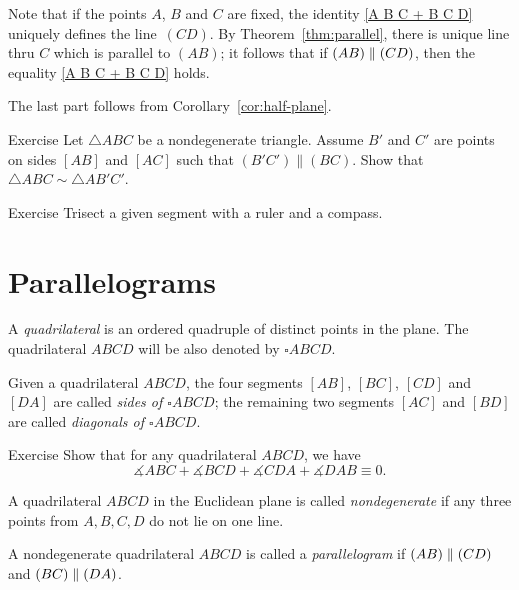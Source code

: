 Note that if the points $A$, $B$ and $C$ are fixed,
the identity \ref{A B C + B C D} uniquely defines the line~$(C D)$.
By Theorem~\ref{thm:parallel}, there is unique line thru $C$ which is parallel to $(AB)$;
it follows that
if $(AB)\z\parallel(C D)$, then the equality \ref{A B C + B C D} holds.

The last part follows from Corollary~\ref{cor:half-plane}.
\qeds


\begin{thm}{Exercise}\label{ex:smililar+parallel}
Let $\triangle ABC$ be a nondegenerate triangle.
Assume $B'$ and $C'$ are points on sides $[AB]$ and $[AC]$ such that $(B'C')\parallel(BC)$.
Show that $\triangle ABC\sim\triangle AB'C'$.
\end{thm}

\begin{thm}{Exercise}\label{ex:trisection}
Trisect a given segment with a ruler and a compass.
\end{thm}





\section*{Parallelograms}

A \emph{quadrilateral} is an ordered quadruple of distinct points in the plane.
The quadrilateral $ABCD$ will be also denoted by $\square ABCD$.

Given a quadrilateral $ABCD$,
the four segments $[AB]$, $[BC]$, $[CD]$ and $[DA]$ are called \emph{sides of $\square ABCD$};
the remaining two segments $[AC]$ and $[BD]$ are called \emph{diagonals of $\square ABCD$}.


\begin{thm}{Exercise}\label{ex:quadrilateral}
Show that for any quadrilateral $ABCD$, we have
$$\measuredangle ABC+\measuredangle BCD+\measuredangle CDA+\measuredangle DAB\equiv 0.$$

\end{thm}

A quadrilateral $ABCD$ in the Euclidean plane is called \emph{nondegenerate} if any three points from $A,B,C,D$ do not lie on one line.

A nondegenerate quadrilateral $ABCD$ is called a \emph{parallelogram}
if $(AB)\z\parallel (CD)$ and $(BC)\z\parallel (DA)$.

